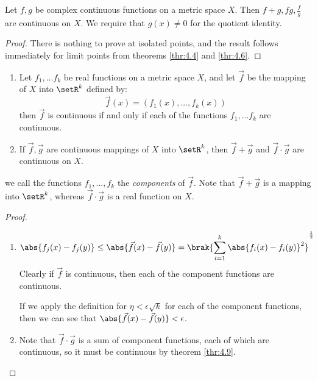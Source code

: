 \documentclass[12pt, letterpaper]{paper}
\begin{document}
\begin{theorem}
  \label{thr:4.9}
  Let $f,g$ be complex continuous functions on a metric space
  $X$. Then $f+g, fg, \frac{f}{g}$ are continuous on $X$. We require
  that $g(x) \neq 0$ for the quotient identity.
\end{theorem}
\begin{proof}
  There is nothing to prove at isolated points, and the result follows
  immediately for limit points from theorems \ref{thr:4.4} and
  \ref{thr:4.6}.
\end{proof}

\begin{theorem}
  \label{thr:4.10}
  \begin{enumerate}
  \item Let $f_1, ... f_k$ be real functions on a metric space $X$,
    and let $\vec{f}$ be the mapping of $X$ into $\setR^k$ defined by:
    \begin{equation*}
      \vec{f}(x) = ( f_1(x), ..., f_k(x))
    \end{equation*}
    then $\vec{f}$ is continuous if and only if each of the functions
    $f_1, ... f_k$ are continuous.
  \item If $\vec{f}, \vec{g}$ are continuous mappings of $X$ into
    $\setR^k$, then $\vec{f} + \vec{g}$ and $\vec{f}\cdot \vec{g}$ are
    continuous on $X$.
  \end{enumerate}
  we call the functions $f_1, ..., f_k$ the \emph{components} of
  $\vec{f}$. Note that $\vec{f} + \vec{g}$ is a mapping into
  $\setR^k$, whereas $\vec{f} \cdot \vec{g}$ is a real function on
  $X$.
  \begin{proof}
    \begin{enumerate}
    \item
      \begin{equation*}
        \abs{ f_j(x) - f_j(y)} \leq \abs{ \vec{f}(x) - \vec{f}(y)} =
        \brak{ \sum_{i=1}^k \abs{ f_i(x) - f_i(y)}^2}^{\frac{1}{2}}
      \end{equation*}
      Clearly if $\vec{f}$ is continuous, then each of the component
      functions are continuous.

      If we apply the definition for $\eta < \epsilon \sqrt{k}$ for
      each of the component functions, then we can see that
      $\abs{\vec{f}(x) - \vec{f}(y)} < \epsilon$.
    \item Note that $\vec{f} \cdot \vec{g}$ is a sum of component
      functions, each of which are continuous, so it must be
      continuous by theorem \ref{thr:4.9}.

    \end{enumerate}
  \end{proof}
\end{theorem}
\end{document}
